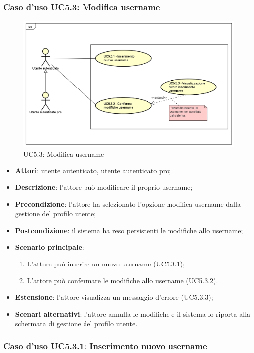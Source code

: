 \subsubsection{Caso d'uso UC5.3: Modifica username}
\label{UC5.3}
\begin{figure}[h]
	\centering
	\includegraphics[scale=0.5,keepaspectratio]{UML/UC5_3.png}
	\caption{UC5.3: Modifica username}
\end{figure}
\begin{itemize}
	\item \textbf{Attori}: utente autenticato, utente autenticato pro;
	\item \textbf{Descrizione}: l'attore può modificare il proprio username;
	\item \textbf{Precondizione}: l'attore ha selezionato l'opzione modifica username dalla gestione del profilo utente; 
	\item \textbf{Postcondizione}: il sistema ha reso persistenti le modifiche allo username;
	\item \textbf{Scenario principale}:
	\begin{enumerate}
		\item L'attore può inserire un nuovo username (UC5.3.1);
		\item L'attore può confermare le modifiche allo username (UC5.3.2).
	\end{enumerate}
	\item \textbf{Estensione}: l'attore visualizza un messaggio d'errore (UC5.3.3);
	\item \textbf{Scenari alternativi}: l'attore annulla le modifiche e il sistema lo riporta alla schermata di gestione del profilo utente.
\end{itemize}

\subsubsection{Caso d'uso UC5.3.1: Inserimento nuovo username}

